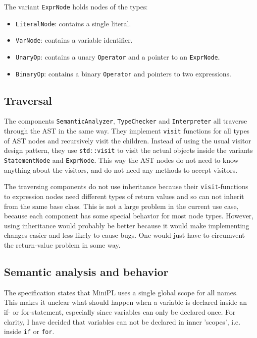 \documentclass[a4paper]{article}
\newcommand*{\code}[1]{\texttt{#1}}
\begin{document}
The variant \code{ExprNode} holds nodes of the types:
\begin{itemize}
  \item \code{LiteralNode}: contains a single literal.
  \item \code{VarNode}: contains a variable identifier.
  \item \code{UnaryOp}: contains a unary \code{Operator} and a pointer to an 
  \code{ExprNode}.
  \item \code{BinaryOp}: contains a binary \code{Operator} and 
  pointers to two expressions. 
\end{itemize}

\subsection{Traversal}

The components \code{SemanticAnalyzer}, \code{TypeChecker} and 
\code{Interpreter} all traverse through the AST in the same way. 
They implement \code{visit} functions for all types of AST nodes 
and recursively visit the children.
Instead of using the usual visitor design pattern, they use 
\code{std::visit} to visit the actual objects inside the variants
\code{StatementNode} and \code{ExprNode}. This way the 
AST nodes do not need to know anything about the visitors, 
and do not need any methods to accept visitors. 

The traversing 
components do not use inheritance because their \code{visit}-functions 
to expression nodes need different types of return values and 
so can not inherit from the same base class. This is not a large 
problem in the current use case, because each component has 
some special behavior for most node types. However, using 
inheritance would probably be better because it would make 
implementing changes easier and less likely to cause bugs.
One would just have to circumvent the return-value problem in some way.

\subsection{Semantic analysis and behavior}

The specification states that MiniPL uses a single global scope 
for all names. This makes it unclear what should happen when 
a variable is declared inside an if- or for-statement, 
especially since variables can only be declared once.
For clarity, I have decided that variables can not be 
declared in inner 'scopes', i.e. inside \code{if} or \code{for}.
\end{document}
